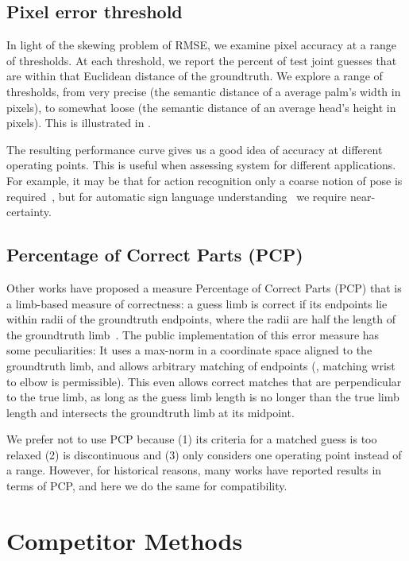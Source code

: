\subsection{Pixel error threshold}  In light of the skewing problem of RMSE, we 
examine pixel accuracy at a range of thresholds.  At each threshold, we report 
the percent of test joint guesses that are within that Euclidean distance of 
the groundtruth.  We explore a range of thresholds, from very precise (the 
semantic distance of a average palm's width in pixels), to somewhat loose (the 
semantic distance of an average head's height in pixels).  This is illustrated 
in .

The resulting performance curve gives us a good idea of accuracy at different 
operating points.  This is useful when assessing system for different 
applications. For example, it may be that for action recognition only a coarse 
notion of pose is required~\citep{wang2011}, but for automatic sign language 
understanding~\citep{buehler2009} we require near-certainty.

\subsection{Percentage of Correct Parts (PCP)}  Other works have proposed a 
measure Percentage of Correct Parts (PCP) that is a limb-based measure of 
correctness: a guess limb is correct if its endpoints lie within radii of the 
groundtruth endpoints, where the radii are half the length of the groundtruth 
limb~\citep{ferrari08,eichner09}.  The public implementation of this error 
measure \citep{eichner09} has some peculiarities: It uses a max-norm in a 
coordinate space aligned to the groundtruth limb, and allows arbitrary matching 
of endpoints (\eg, matching wrist to elbow is permissible).  This even allows 
correct matches that are perpendicular to the true limb, as long as the guess 
limb length is no longer than the true limb length and intersects the 
groundtruth limb at its midpoint.  

We prefer not to use PCP because (1) its criteria for a matched guess is too 
relaxed (2) is discontinuous and (3) only considers one operating point instead 
of a range.  However, for historical reasons, many works have reported results 
in terms of PCP, and here we do the same for compatibility.

\section{Competitor Methods}\label{sec:competition}

